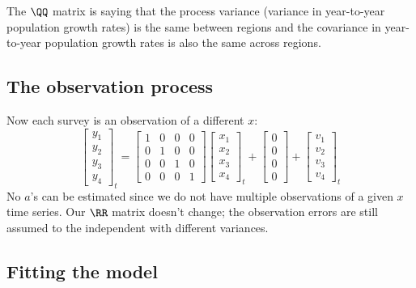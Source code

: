 The $\QQ$ matrix is saying that the process variance (variance in year-to-year population growth rates) is the same between regions and the covariance in year-to-year population growth rates is also the same across regions.

\subsection{The observation process}
Now each survey is an observation of a different $x$:
\begin{equation}
 \left[ \begin{array}{c}
    y_{1} \\
    y_{2} \\
    y_{3} \\
    y_{4}  \end{array} \right]_t = 
\begin{bmatrix}
    1 & 0 & 0 & 0 \\
    0 & 1 & 0 & 0\\
    0 & 0 & 1 & 0 \\
    0 & 0 & 0 & 1 \end{bmatrix} \begin{bmatrix}x_1\\x_2\\x_3\\x_4\end{bmatrix}_t +  
    \left[ \begin{array}{c}
    0 \\
    0 \\
    0 \\
    0  \end{array} \right] + 
    \left[ \begin{array}{c}
    v_{1} \\
    v_{2} \\
    v_{3} \\
    v_{4}  \end{array} \right]_t 
 \label{eq:meas}\end{equation}
No $a$'s can be estimated since we do not have multiple observations of a given $x$ time series. Our $\RR$ matrix doesn't change; the observation errors are still assumed to the independent with different variances.


\subsection{Fitting the model}

